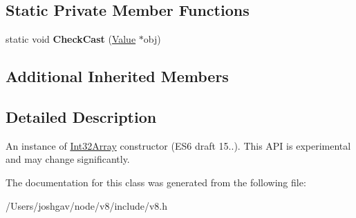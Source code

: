 \subsection*{Static Private Member Functions}
\begin{DoxyCompactItemize}
\item 
static void {\bfseries Check\+Cast} (\hyperlink{classv8_1_1_value}{Value} $\ast$obj)\hypertarget{classv8_1_1_int32_array_ab29d9e42a098d602e184deb555ba1757}{}\label{classv8_1_1_int32_array_ab29d9e42a098d602e184deb555ba1757}

\end{DoxyCompactItemize}
\subsection*{Additional Inherited Members}


\subsection{Detailed Description}
An instance of \hyperlink{classv8_1_1_int32_array}{Int32\+Array} constructor (E\+S6 draft 15..). This A\+PI is experimental and may change significantly. 

The documentation for this class was generated from the following file\+:\begin{DoxyCompactItemize}
\item 
/\+Users/joshgav/node/v8/include/v8.\+h\end{DoxyCompactItemize}
